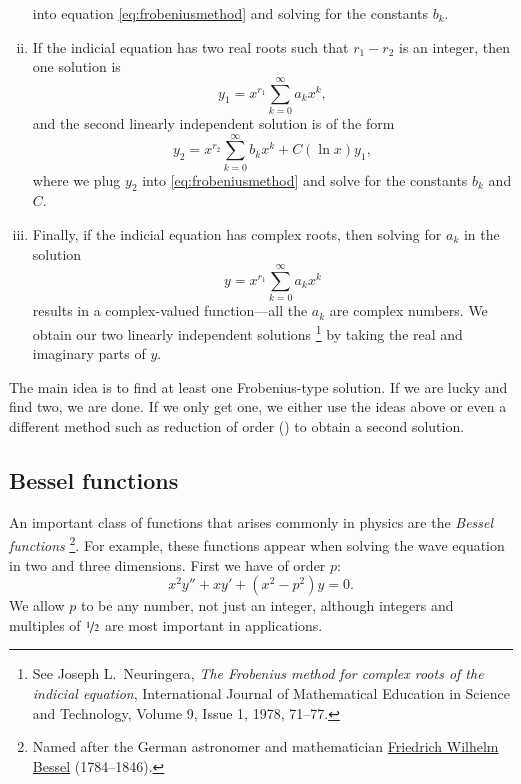 \documentclass[12pt]{book}
\begin{document}
\begin{enumerate}[(i)]
into equation \eqref{eq:frobeniusmethod} and solving for the constants $b_k$.
\item
If the indicial equation has two real roots such that $r_1-r_2$ is
an integer, then one solution is
\begin{equation*}
y_1 = x^{r_1} \sum_{k=0}^\infty a_k x^{k} ,
\end{equation*}
and the second linearly independent solution is of the form
\begin{equation*}
y_2 = x^{r_2} \sum_{k=0}^\infty b_k x^{k} + C (\ln x) y_1 ,
\end{equation*}
where we plug $y_2$ into \eqref{eq:frobeniusmethod} and solve for the
constants $b_k$ and $C$.
\item
Finally, if the indicial equation has complex roots, then solving
for $a_k$ in the solution
\begin{equation*}
y = x^{r_1} \sum_{k=0}^\infty a_k x^{k}
\end{equation*}
results in a complex-valued function---all the $a_k$ are complex
numbers.  We obtain our two linearly independent
solutions%
\footnote{See 
Joseph L.\ Neuringera,
\emph{The Frobenius method for complex roots of the indicial equation},
International Journal of Mathematical Education in Science and Technology,
Volume 9, Issue 1, 1978, 71--77.}
by taking the real and imaginary parts of $y$.
\end{enumerate}

The main idea is to find at least one Frobenius-type solution.  If
we are lucky and find two, we are done.
If we only get one, we either use the ideas above or even a different method
such as reduction of order () to
obtain a second solution.

\subsection{Bessel functions}

An important class of functions that arises commonly in physics are the
\emph{Bessel functions}%
\footnote{Named after
the German astronomer and mathematician
\href{http://en.wikipedia.org/wiki/Friedrich_Bessel}{Friedrich Wilhelm
Bessel} (1784--1846).}.
For example, these functions appear when solving the
wave equation in two and three dimensions.  First we have 
\emph{} of order $p$:
\begin{equation*}
x^2 y'' + xy' + \left(x^2 - p^2\right)y = 0 .
\end{equation*}
We allow $p$ to be any number, not just an integer, although integers
and multiples of $\nicefrac{1}{2}$ are most important in applications.
\end{document}
